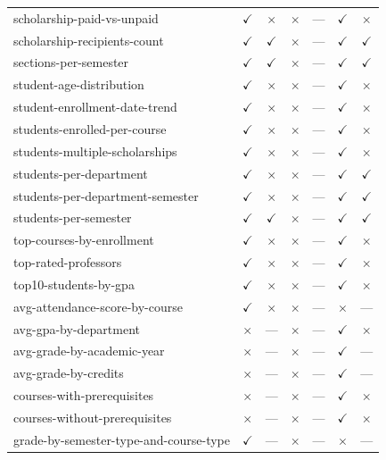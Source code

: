 \begin{longtable}{lcccccc}
scholarship-paid-vs-unpaid & $\checkmark$ & $\times$ & $\times$ & --- & $\checkmark$ & $\times$ \\
scholarship-recipients-count & $\checkmark$ & $\checkmark$ & $\times$ & --- & $\checkmark$ & $\checkmark$ \\
sections-per-semester & $\checkmark$ & $\checkmark$ & $\times$ & --- & $\checkmark$ & $\checkmark$ \\
student-age-distribution & $\checkmark$ & $\times$ & $\times$ & --- & $\checkmark$ & $\times$ \\
student-enrollment-date-trend & $\checkmark$ & $\times$ & $\times$ & --- & $\checkmark$ & $\times$ \\
students-enrolled-per-course & $\checkmark$ & $\times$ & $\times$ & --- & $\checkmark$ & $\times$ \\
students-multiple-scholarships & $\checkmark$ & $\times$ & $\times$ & --- & $\checkmark$ & $\times$ \\
students-per-department & $\checkmark$ & $\times$ & $\times$ & --- & $\checkmark$ & $\checkmark$ \\
students-per-department-semester & $\checkmark$ & $\times$ & $\times$ & --- & $\checkmark$ & $\checkmark$ \\
students-per-semester & $\checkmark$ & $\checkmark$ & $\times$ & --- & $\checkmark$ & $\checkmark$ \\
top-courses-by-enrollment & $\checkmark$ & $\times$ & $\times$ & --- & $\checkmark$ & $\times$ \\
top-rated-professors & $\checkmark$ & $\times$ & $\times$ & --- & $\checkmark$ & $\times$ \\
top10-students-by-gpa & $\checkmark$ & $\times$ & $\times$ & --- & $\checkmark$ & $\times$ \\
avg-attendance-score-by-course & $\checkmark$ & $\times$ & $\times$ & --- & $\times$ & --- \\
avg-gpa-by-department & $\times$ & --- & $\times$ & --- & $\checkmark$ & $\times$ \\
avg-grade-by-academic-year & $\times$ & --- & $\times$ & --- & $\checkmark$ & --- \\
avg-grade-by-credits & $\times$ & --- & $\times$ & --- & $\checkmark$ & --- \\
courses-with-prerequisites & $\times$ & --- & $\times$ & --- & $\checkmark$ & $\times$ \\
courses-without-prerequisites & $\times$ & --- & $\times$ & --- & $\checkmark$ & $\times$ \\
grade-by-semester-type-and-course-type & $\checkmark$ & --- & $\times$ & --- & $\times$ & --- \\

\end{longtable}
